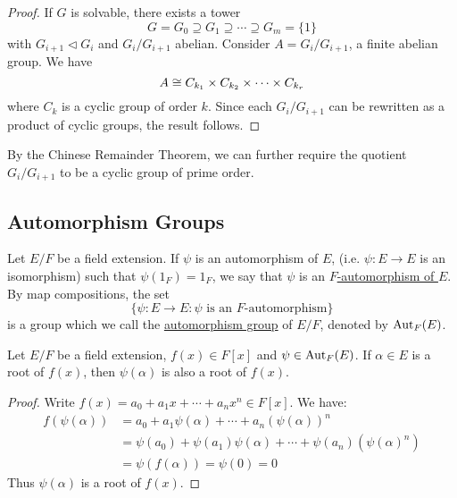 \documentclass[11pt]{article}
\begin{document}
\begin{proof}
    If $G$ is solvable, there exists a tower
    \[G=G_0\supseteq G_1\supseteq\cdots\supseteq G_m=\{1\}\]
    with $G_{i+1}\lhd G_i$ and $G_i/G_{i+1}$ abelian. Consider $A=G_i/G_{i+1}$, a finite abelian group. We have
    \[A\cong C_{k_1}\times C_{k_2}\times\cdots\times C_{k_r}\]
    where $C_k$ is a cyclic group of order $k$. Since each $G_i/G_{i+1}$ can be rewritten as a product of cyclic groups, the result follows.
    
\end{proof}

\begin{remark}
    By the Chinese Remainder Theorem, we can further require the quotient $G_i/G_{i+1}$ to be a cyclic group of prime order.
\end{remark}

\subsection{Automorphism Groups}

\begin{definition}
    Let $E/F$ be a field extension. If $\psi$ is an automorphism of $E$, (i.e. $\psi:E\to E$ is an isomorphism) such that $\psi(1_F)=1_F$, we say that $\psi$ is an \ul{$F$-automorphism of $E$}. By map compositions, the set
    \[\{\psi:E\to E:\psi\text{ is an $F$-automorphism}\}\]
    is a group which we call the \ul{automorphism group} of $E/F$, denoted by $\operatorname{Aut}_F(E)$.
\end{definition}

\begin{lemma}
    Let $E/F$ be a field extension, $f(x)\in F[x]$ and $\psi\in\operatorname{Aut}_F(E)$. If $\alpha\in E$ is a root of $f(x)$, then $\psi(\alpha)$ is also a root of $f(x)$.
\end{lemma}

\begin{proof}
    Write $f(x)=a_0+a_1x+\cdots+a_nx^n\in F[x]$. We have:
    \begin{align*}
        f(\psi(\alpha))&=a_0+a_1\psi(\alpha)+\cdots+a_n(\psi(\alpha))^n \\
        &=\psi(a_0)+\psi(a_1)\psi(\alpha)+\cdots+\psi(a_n)(\psi(\alpha)^n) \\
        &=\psi(f(\alpha))=\psi(0)=0
    \end{align*}
    Thus $\psi(\alpha)$ is a root of $f(x)$.
    
\end{proof}
\end{document}
